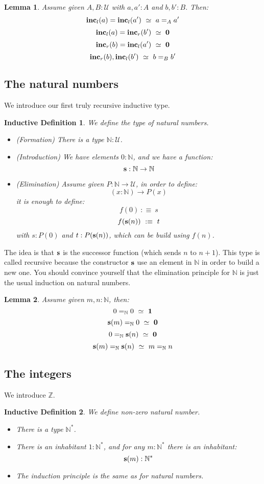 \documentclass{article}
\newcommand{\sse}[1]{\medbreak \subsection{#1}}
\newcommand{\U}{{\mathcal U}}
\renewcommand{\r}{\rightarrow}
\newcommand{\one}{{\bf 1}}
\newcommand{\zero}{{\bf 0}}
\newcommand{\s}{\mathrm{\bf s}}
\newcommand{\inc}{\mathrm{\bf inc}}
\newtheorem{lemma}{Lemma}
\newtheorem{ind_def}{Inductive Definition}
\begin{document}

\begin{lemma}
Assume given $A,B:\U$ with $a,a':A$ and $b,b':B$. Then:
\[\inc_l(a) = \inc_l(a') \ \simeq \ a=_Aa'\]
\[\inc_l(a) = \inc_r(b')\ \simeq \ \zero\]
\[\inc_r(b) = \inc_l(a') \ \simeq \ \zero\]
\[\inc_r(b),\inc_l(b') \ \simeq \ b=_Bb'\]
\end{lemma}


\sse{The natural numbers}

We introduce our first truly recursive inductive type.

\begin{ind_def}
We define the type of natural numbers.
\begin{itemize}
\item (Formation) There is a type $\mathbb{N}:\U$.
\item (Introduction) We have elements $0:\mathbb{N}$, and we have a function:
\[\s : \mathbb{N} \r \mathbb{N}\]
\item (Elimination) Assume given $P:\mathbb{N}\r \U$, in order to define:
\[(x:\mathbb{N})\r P(x)\]
it is enough to define:
\[f(0) \ :\equiv\ s\]
\[f(\s(n)) \ :\equiv\ t\]
with $s:P(0)$ and $t:P(\s(n))$, which can be build using $f(n)$.
\end{itemize}
\end{ind_def}

The idea is that $\s$ is the successor function (which sends $n$ to $n+1$). This type is called recursive because the constructor $\s$ use an element in $\mathbb{N}$ in order to build a new one. You should convince yourself that the elimination principle for $\mathbb{N}$ is just the usual induction on natural numbers.

\begin{lemma}
Assume given $m,n:\mathbb{N}$, then:
\[0=_\mathbb{N}0\ \simeq\ \one\]
\[\s(m)=_\mathbb{N}0\ \simeq\ \zero\]
\[0=_\mathbb{N}\s(n)\ \simeq\ \zero\]
\[\s(m)=_\mathbb{N}\s(n)\ \simeq\ m=_\mathbb{N}n\]
\end{lemma}


\sse{The integers}

We introduce $\mathbb{Z}$.

\begin{ind_def}
We define non-zero natural number.
\begin{itemize}
\item There is a type $\mathbb{N}^*$.
\item There is an inhabitant $1:\mathbb{N}^*$, and for any $m:\mathbb{N}^*$ there is an inhabitant:
\[\s(m):\mathbb{N}^*\]
\item The induction principle is the same as for natural numbers.
\end{itemize}
\end{ind_def}
\end{document}
